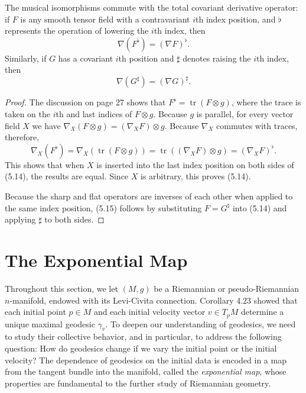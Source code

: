 \begin{proposition}
\label{prop:musical-isomorphisms-commute}

The musical isomorphisms commute with the total covariant derivative operator: if $F$ is any smooth tensor field with a contravariant $i$th index position, and $\flat$ represents the operation of lowering the $i$th index, then
\begin{equation}
\nabla(F^\flat) = (\nabla F)^\flat. \tag{5.14}
\end{equation}
Similarly, if $G$ has a covariant $i$th position and $\sharp$ denotes raising the $i$th index, then
\begin{equation}
\nabla(G^\sharp) = (\nabla G)^\sharp. \tag{5.15}
\end{equation}

\begin{proof}
The discussion on page 27 shows that $F^\flat = \operatorname{tr}(F \otimes g)$, where the trace is taken on the $i$th and last indices of $F \otimes g$. Because $g$ is parallel, for every vector field $X$ we have $\nabla_X(F \otimes g) = (\nabla_X F) \otimes g$. Because $\nabla_X$ commutes with traces, therefore,
\[
\nabla_X(F^\flat) = \nabla_X(\operatorname{tr}(F \otimes g)) = \operatorname{tr}((\nabla_X F) \otimes g) = (\nabla_X F)^\flat.
\]
This shows that when $X$ is inserted into the last index position on both sides of (5.14), the results are equal. Since $X$ is arbitrary, this proves (5.14).

Because the sharp and flat operators are inverses of each other when applied to the same index position, (5.15) follows by substituting $F = G^\sharp$ into (5.14) and applying $\sharp$ to both sides.
\end{proof}
\end{proposition}

\section{The Exponential Map}

Throughout this section, we let $(M, g)$ be a Riemannian or pseudo-Riemannian $n$-manifold, endowed with its Levi-Civita connection. Corollary 4.23 showed that each initial point $p \in M$ and each initial velocity vector $v \in T_p M$ determine a unique maximal geodesic $\gamma_v$. To deepen our understanding of geodesics, we need to study their collective behavior, and in particular, to address the following question: How do geodesics change if we vary the initial point or the initial velocity? The dependence of geodesics on the initial data is encoded in a map from the tangent bundle into the manifold, called the \emph{exponential map}, whose properties are fundamental to the further study of Riemannian geometry.

